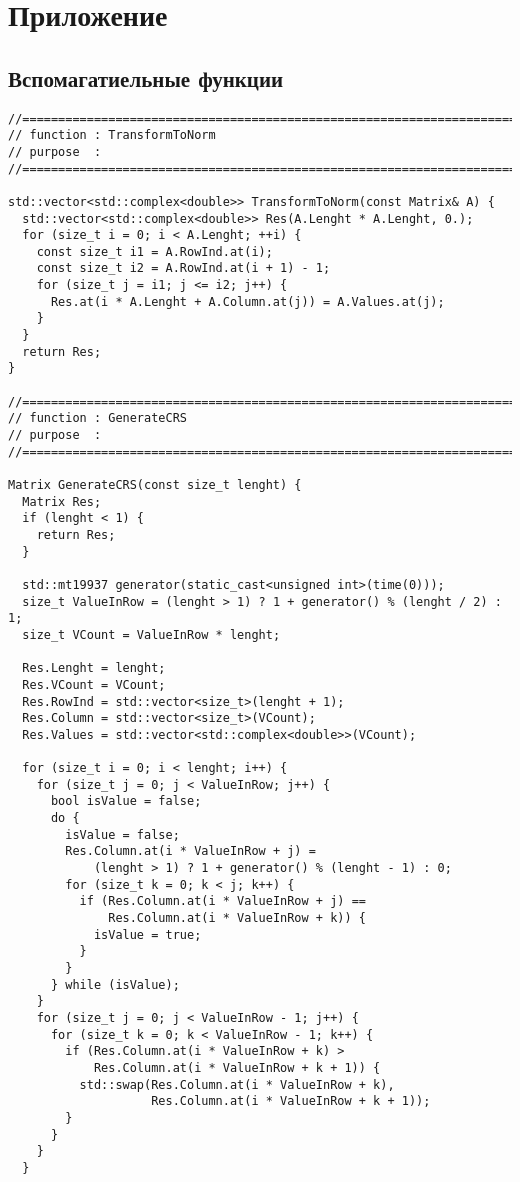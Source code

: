 \documentclass{report}
\begin{document}
\section*{Приложение}
\subsection*{Вспомагатиельные функции}
\begin{lstlisting}
//=======================================================================
// function : TransformToNorm
// purpose  :
//=======================================================================

std::vector<std::complex<double>> TransformToNorm(const Matrix& A) {
  std::vector<std::complex<double>> Res(A.Lenght * A.Lenght, 0.);
  for (size_t i = 0; i < A.Lenght; ++i) {
    const size_t i1 = A.RowInd.at(i);
    const size_t i2 = A.RowInd.at(i + 1) - 1;
    for (size_t j = i1; j <= i2; j++) {
      Res.at(i * A.Lenght + A.Column.at(j)) = A.Values.at(j);
    }
  }
  return Res;
}

//=======================================================================
// function : GenerateCRS
// purpose  :
//=======================================================================

Matrix GenerateCRS(const size_t lenght) {
  Matrix Res;
  if (lenght < 1) {
    return Res;
  }

  std::mt19937 generator(static_cast<unsigned int>(time(0)));
  size_t ValueInRow = (lenght > 1) ? 1 + generator() % (lenght / 2) : 1;
  size_t VCount = ValueInRow * lenght;

  Res.Lenght = lenght;
  Res.VCount = VCount;
  Res.RowInd = std::vector<size_t>(lenght + 1);
  Res.Column = std::vector<size_t>(VCount);
  Res.Values = std::vector<std::complex<double>>(VCount);

  for (size_t i = 0; i < lenght; i++) {
    for (size_t j = 0; j < ValueInRow; j++) {
      bool isValue = false;
      do {
        isValue = false;
        Res.Column.at(i * ValueInRow + j) =
            (lenght > 1) ? 1 + generator() % (lenght - 1) : 0;
        for (size_t k = 0; k < j; k++) {
          if (Res.Column.at(i * ValueInRow + j) ==
              Res.Column.at(i * ValueInRow + k)) {
            isValue = true;
          }
        }
      } while (isValue);
    }
    for (size_t j = 0; j < ValueInRow - 1; j++) {
      for (size_t k = 0; k < ValueInRow - 1; k++) {
        if (Res.Column.at(i * ValueInRow + k) >
            Res.Column.at(i * ValueInRow + k + 1)) {
          std::swap(Res.Column.at(i * ValueInRow + k),
                    Res.Column.at(i * ValueInRow + k + 1));
        }
      }
    }
  }


\end{lstlisting}
\end{document}
